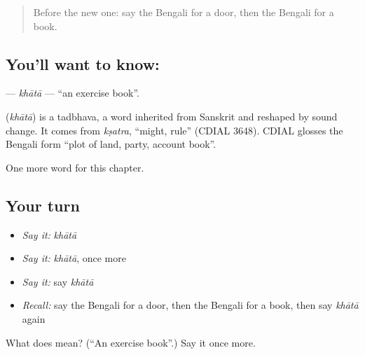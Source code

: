 \label{lesson:BN-C63-khata}



\begin{quote}
Before the new one: say the Bengali for a door, then the Bengali for a book.
\end{quote}

\subsection*{You'll want to know: }
\textbf{} — \emph{khātā} — \textquotedblleft{}an exercise book\textquotedblright{}.

\begin{cousinweb}
\textbf{} (\emph{khātā}) is a tadbhava, a word inherited from Sanskrit and reshaped by sound change. It comes from \emph{kṣatra}, \textquotedblleft{}might, rule\textquotedblright{} (CDIAL 3648). CDIAL glosses the Bengali form \textquotedblleft{}plot of land, party, account book\textquotedblright{}.
\end{cousinweb}

\begin{grammarlens}[title={What you've built}]
One more word for this chapter.
\end{grammarlens}

\subsection*{Your turn}
\begin{itemize}
\raggedright
  \item \emph{Say it:} \emph{khātā}
  \item \emph{Say it:} \emph{khātā}, once more
  \item \emph{Say it:} say \emph{khātā}
  \item \emph{Recall:} say the Bengali for a door, then the Bengali for a book, then say \emph{khātā} again
\end{itemize}

\begin{tcolorbox}[breakable,colback=teal!4,colframe=teal!35!black,title={Before you move on}]
What does  mean? (\textquotedblleft{}An exercise book\textquotedblright{}.) Say it once more.
\end{tcolorbox}
